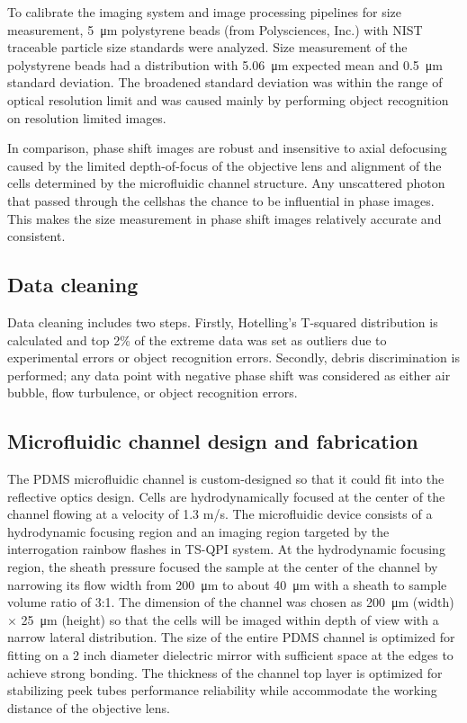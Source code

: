 \documentclass[aps,pra,reprint,superscriptaddress]{revtex4-1}
\begin{document}
To calibrate the imaging system and image processing pipelines for size measurement, \SI{5}{\micro\meter} polystyrene beads (from Polysciences, Inc.) with NIST traceable particle size standards were analyzed. Size measurement of the polystyrene beads had a distribution with \SI{5.06}{\micro\meter} expected mean and \SI{0.5}{\micro\meter} standard deviation. The broadened standard deviation was within the range of optical resolution limit and was caused mainly by performing object recognition on resolution limited images.

In comparison, phase shift images are robust and insensitive to axial defocusing \cite{spadinger1990effect} caused by the limited depth-of-focus of the objective lens and alignment of the cells determined by the microfluidic channel structure. Any unscattered photon that passed through the cellshas the chance to be influential in phase images. This makes the size measurement in phase shift images relatively accurate and consistent. 

\subsection{Data cleaning}

Data cleaning includes two steps. Firstly, Hotelling's T-squared distribution is calculated and top 2\% of the extreme data was set as outliers due to experimental errors or object recognition errors. Secondly, debris discrimination is performed; any data point with negative phase shift was considered as either air bubble, flow turbulence, or object recognition errors.

\subsection{Microfluidic channel design and fabrication}

The PDMS microfluidic channel is custom-designed so that it could fit into the reflective optics design. Cells are hydrodynamically focused \cite{knight1998hydrodynamic,lee2006hydrodynamic} at the center of the channel flowing at a velocity of 1.3 m/s. The microfluidic device consists of a hydrodynamic focusing region and an imaging region targeted by the interrogation rainbow flashes in TS-QPI system. At the hydrodynamic focusing region, the sheath pressure focused the sample at the center of the channel by narrowing its flow width from \SI{200}{\micro\meter} to about \SI{40}{\micro\meter} with a sheath to sample volume ratio of 3:1. The dimension of the channel was chosen as \SI{200}{\micro\meter} (width) $\times$ \SI{25}{\micro\meter} (height) so that the cells will be imaged within depth of view with a narrow lateral distribution. The size of the entire PDMS channel is optimized for fitting on a 2 inch diameter dielectric mirror with sufficient space at the edges to achieve strong bonding. The thickness of the channel top layer is optimized for stabilizing peek tubes performance reliability while accommodate the working distance of the objective lens. 
\end{document}
